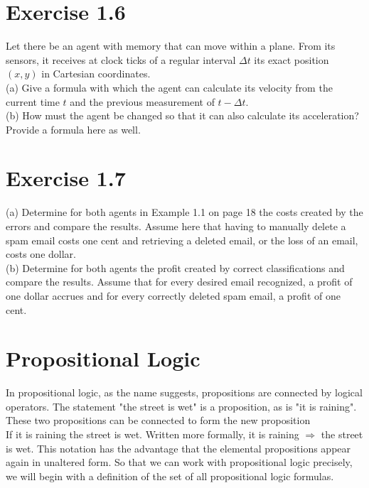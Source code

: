 \documentclass[10pt]{book}
\begin{document}
\section{Exercise 1.6}
Let there be an agent with memory that can move within a plane. From its sensors, it receives at clock ticks of a regular interval $\Delta t$ its exact position $(x, y)$ in Cartesian coordinates.\\
(a) Give a formula with which the agent can calculate its velocity from the current time $t$ and the previous measurement of $t-\Delta t$.\\
(b) How must the agent be changed so that it can also calculate its acceleration? Provide a formula here as well.

\section{Exercise 1.7}
(a) Determine for both agents in Example 1.1 on page 18 the costs created by the errors and compare the results. Assume here that having to manually delete a spam email costs one cent and retrieving a deleted email, or the loss of an email, costs one dollar.\\
(b) Determine for both agents the profit created by correct classifications and compare the results. Assume that for every desired email recognized, a profit of one dollar accrues and for every correctly deleted spam email, a profit of one cent.

\section{Propositional Logic}
In propositional logic, as the name suggests, propositions are connected by logical operators. The statement "the street is wet" is a proposition, as is "it is raining". These two propositions can be connected to form the new proposition\\
If it is raining the street is wet. Written more formally, it is raining $\Rightarrow$ the street is wet. This notation has the advantage that the elemental propositions appear again in unaltered form. So that we can work with propositional logic precisely, we will begin with a definition of the set of all propositional logic formulas.
\end{document}
